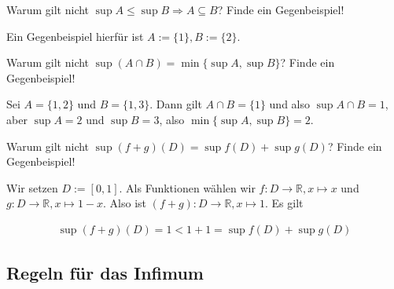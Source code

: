 \documentclass[fontsize=9pt,
               parskip=half-,
               DIV=14,
               listof=chapterentry,
               tocflat]{scrbook}
\begin{document}
\begin{mdframed}[style=semanticbox,frametitleaboveskip=3pt,innerbottommargin=3pt,frametitle=Frage]
Warum gilt nicht $\sup A\leq \sup B\Rightarrow A\subseteq B$? Finde ein Gegenbeispiel!

\end{mdframed}

\begin{answer*}
Ein Gegenbeispiel hierfür ist $A:=\{1\},B:=\{2\}$.

\end{answer*}

\begin{mdframed}[style=semanticbox,frametitleaboveskip=3pt,innerbottommargin=3pt,frametitle=Frage]
Warum gilt nicht $\sup(A\cap B)=\min\{\sup A,\sup B\}$? Finde ein Gegenbeispiel!

\end{mdframed}

\begin{answer*}
Sei $A=\{1,2\}$ und $B=\{1,3\}$. Dann gilt $A\cap B=\{1\}$ und also $\sup A\cap B=1$, aber $\sup A=2$ und $\sup B=3$, also $\min\{\sup A,\sup B\}=2$.

\end{answer*}

\begin{mdframed}[style=semanticbox,frametitleaboveskip=3pt,innerbottommargin=3pt,frametitle=Frage]
Warum gilt nicht $\sup(f+g)(D)=\sup f(D)+\sup g(D)$? Finde ein Gegenbeispiel!

\end{mdframed}

\begin{answer*}
Wir setzen $D:=[0,1]$. Als Funktionen wählen wir $f:D\to \mathbb {R} ,x\mapsto x$ und $g:D\to \mathbb {R} ,x\mapsto 1-x$. Also ist $(f+g):D\to \mathbb {R} ,x\mapsto 1$. Es gilt

\begin{align*}
\sup(f+g)(D)=1<1+1=\sup f(D)+\sup g(D)
\end{align*}

\end{answer*}

\subsection{Regeln für das Infimum}
\end{document}
